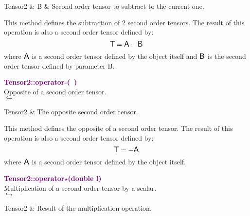 \begin{tcolorbox}[width=\textwidth,myArgs,tabularx={ll|R}]
Tensor2 & B & Second order tensor to subtract to the current one.
\end{tcolorbox}

This method defines the subtraction of 2 second order tensors.
The result of this operation is also a second order tensor defined by:
\begin{equation*}
\mbox{\large\ensuremath{\mathsf{T}}} = \mbox{\large\ensuremath{\mathsf{A}}} - \mbox{\large\ensuremath{\mathsf{B}}}
\end{equation*}
where $\mbox{\large\ensuremath{\mathsf{A}}}$ is a second order tensor defined by the object itself and $\mbox{\large\ensuremath{\mathsf{B}}}$ is the second order tensor defined by parameter B.

\textcolor{purple}{\textbf{Tensor2::operator-(~)}}\label{Tensor2::operator-()}\\
Opposite of a second order tensor.\\ \hspace*{5mm}$\hookrightarrow$
\vspace*{-2em}\begin{tcolorbox}[grow to left by=-1cm, width=\textwidth-1cm,myArgs,tabularx={l|R}]
Tensor2 & The opposite second order tensor.
\end{tcolorbox}

This method defines the opposite of a second order tensor.
The result of this operation is also a second order tensor defined by:
\begin{equation*}
\mbox{\large\ensuremath{\mathsf{T}}} = - \mbox{\large\ensuremath{\mathsf{A}}}
\end{equation*}
where $\mbox{\large\ensuremath{\mathsf{A}}}$ is a second order tensor defined by the object itself.

\textcolor{purple}{\textbf{Tensor2::operator$\star$(double l)}}\label{Tensor2::operator*(double l)}\\
Multiplication of a second order tensor by a scalar.\\ \hspace*{5mm}$\hookrightarrow$
\vspace*{-2em}\begin{tcolorbox}[grow to left by=-1cm, width=\textwidth-1cm,myArgs,tabularx={l|R}]
Tensor2 & Result of the multiplication operation.
\end{tcolorbox}


